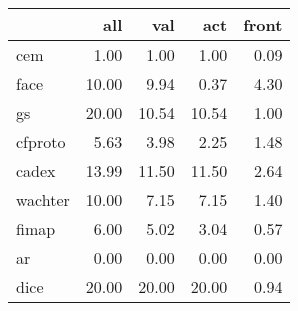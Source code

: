\begin{tabular}{lrrrr}
\hline
{} &    all &    val &    act &  front \\ \hline
\hline
cem                 &   1.00 &   1.00 &   1.00 &   0.09 \\ \hline
face                &  10.00 &   9.94 &   0.37 &   4.30 \\ \hline
gs     &  20.00 &  10.54 &  10.54 &   1.00 \\ \hline
cfproto             &   5.63 &   3.98 &   2.25 &   1.48 \\ \hline
cadex               &  13.99 &  11.50 &  11.50 &   2.64 \\ \hline
wachter             &  10.00 &   7.15 &   7.15 &   1.40 \\ \hline
fimap               &   6.00 &   5.02 &   3.04 &   0.57 \\ \hline
ar &   0.00 &   0.00 &   0.00 &   0.00 \\ \hline
dice                &  20.00 &  20.00 &  20.00 &   0.94 \\ \hline
\hline
\end{tabular}
